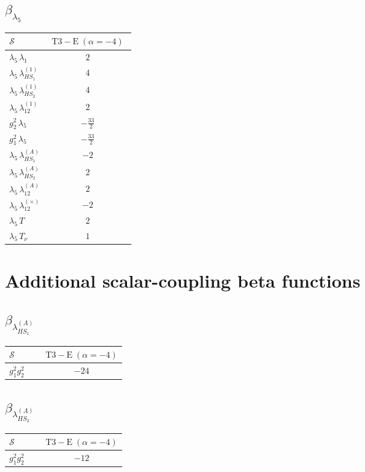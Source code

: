 \documentclass[9pt]{article}
\begin{document}
\subsection*{$ \beta_{\lambda_5} $}
\begin{longtable}{@{}p{0.31\linewidth}c@{}}
\toprule
$\mathcal{S}$ & $ \mathrm{T3-E}\;(\alpha=-4) $ \\
\midrule
$ \lambda_5\,\lambda_1 $ & $ 2 $ \\
$ \lambda_5\,\lambda_{HS_1}^{(1)} $ & $ 4 $ \\
$ \lambda_5\,\lambda_{HS_2}^{(1)} $ & $ 4 $ \\
$ \lambda_5\,\lambda_{12}^{(1)} $ & $ 2 $ \\
$ g_2^2\,\lambda_5 $ & $ - \frac{33}{2} $ \\
$ g_1^2\,\lambda_5 $ & $ - \frac{33}{2} $ \\
$ \lambda_5\,\lambda_{HS_1}^{(A)} $ & $ -2 $ \\
$ \lambda_5\,\lambda_{HS_2}^{(A)} $ & $ 2 $ \\
$ \lambda_5\,\lambda_{12}^{(A)} $ & $ 2 $ \\
$ \lambda_5\,\lambda_{12}^{(\times)} $ & $ -2 $ \\
$ \lambda_5\,T $ & $ 2 $ \\
$ \lambda_5\,T_\nu $ & $ 1 $ \\
\bottomrule
\end{longtable}
\section*{Additional scalar-coupling beta functions}
\subsection*{$ \beta_{\lambda_{HS_1}^{(A)}} $}
\begin{longtable}{@{}p{0.31\linewidth}c@{}}
\toprule
$\mathcal{S}$ & $ \mathrm{T3-E}\;(\alpha=-4) $ \\
\midrule
$ g_1^2g_2^2 $ & $ -24 $ \\
\bottomrule
\end{longtable}
\subsection*{$ \beta_{\lambda_{HS_2}^{(A)}} $}
\begin{longtable}{@{}p{0.31\linewidth}c@{}}
\toprule
$\mathcal{S}$ & $ \mathrm{T3-E}\;(\alpha=-4) $ \\
\midrule
$ g_1^2g_2^2 $ & $ -12 $ \\
\bottomrule
\end{longtable}
\end{document}
